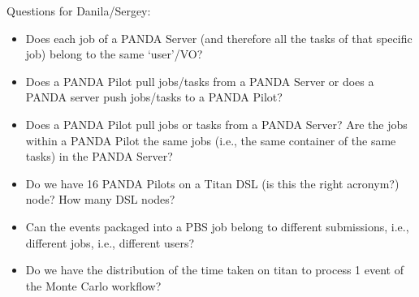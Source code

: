 Questions for Danila/Sergey:
\begin{itemize}
    \item Does each job of a PANDA Server (and therefore all the tasks of that specific job) belong to the same `user'/VO\@?
    \item Does a PANDA Pilot pull jobs/tasks from a PANDA Server or does a PANDA server push jobs/tasks to a PANDA Pilot?
    \item Does a PANDA Pilot pull jobs or tasks from a PANDA Server? Are the jobs within a PANDA Pilot the same jobs (i.e., the same container of the same tasks) in the PANDA Server?
    \item Do we have 16 PANDA Pilots on a Titan DSL (is this the right acronym?) node? How many DSL nodes?
    \item Can the events packaged into a PBS job belong to different submissions, i.e., different jobs, i.e., different users?
    \item Do we have the distribution of the time taken on titan to process 1 event of the Monte Carlo workflow?
\end{itemize}

%
%
%
%
%
%
%
%
%
%
